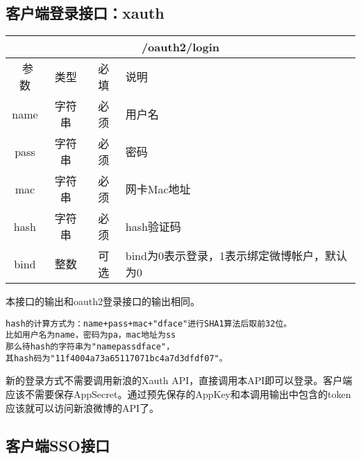 \documentclass[cs4size]{ctexartutf8}
\begin{document}
\subsection{客户端登录接口：xauth}
\label{hash_algorithm}

\begin{table}[H]
   \begin{center}
\begin{tabular}{|c|c|c|p{12cm}|}
\hline
\multicolumn{4}{|c|}{/oauth2/login} \\
\hline\hline
 \  参数  & 类型 & 必填 &  说明  \\
\hline
 name  & 字符串 & 必须 &  用户名\\
 \hline
 pass  & 字符串 & 必须 &  密码\\
  \hline
 mac  & 字符串 & 必须 &  网卡Mac地址\\
 \hline
 hash  & 字符串 & 必须 &  hash验证码\\
\hline
 bind  & 整数 & 可选 &  bind为0表示登录，1表示绑定微博帐户，默认为0\\
\hline
\end{tabular}
   \end{center}
\end{table}

本接口的输出和oauth2登录接口的输出相同。

\begin{verbatim}
hash的计算方式为：name+pass+mac+"dface"进行SHA1算法后取前32位。
比如用户名为name，密码为pa，mac地址为ss
那么待hash的字符串为"namepassdface"，
其hash码为"11f4004a73a65117071bc4a7d3dfdf07"。
\end{verbatim}

新的登录方式不需要调用新浪的Xauth API，直接调用本API即可以登录。客户端应该不需要保存AppSecret。通过预先保存的AppKey和本调用输出中包含的token应该就可以访问新浪微博的API了。



\subsection{客户端SSO接口}
\label{hash_algorithm}
\end{document}
